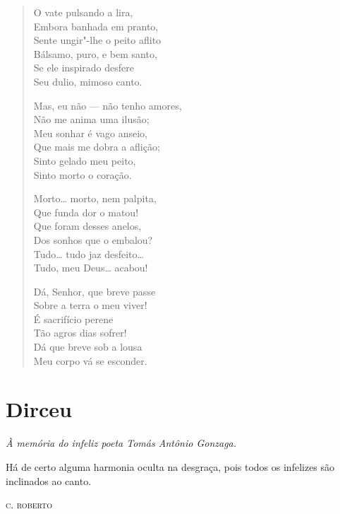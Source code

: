 \begin{verse}
O vate pulsando a lira,\\
Embora banhada em pranto,\\
Sente ungir"-lhe o peito aflito\\
Bálsamo, puro, e bem santo,\\
Se ele inspirado desfere\\
Seu dulio, mimoso canto.

Mas, eu não --- não tenho amores,\\
Não me anima uma ilusão;\\
Meu sonhar é vago anseio,\\
Que mais me dobra a aflição;\\
Sinto gelado meu peito,\\
Sinto morto o coração.

Morto\ldots{} morto, nem palpita,\\
Que funda dor o matou!\\
Que foram desses anelos,\\
Dos sonhos que o embalou?\\
Tudo\ldots{} tudo jaz desfeito\ldots{}\\
Tudo, meu Deus\ldots{} acabou!

Dá, Senhor, que breve passe\\
Sobre a terra o meu viver!\\
É sacrifício perene\\
Tão agros dias sofrer!\\
Dá que breve sob a lousa\\
Meu corpo vá se esconder.
\end{verse}

\chapter{Dirceu}

\hfill{}\emph{À memória do infeliz poeta Tomás Antônio Gonzaga.}

\epigraph{Há de certo alguma harmonia oculta na desgraça, pois todos os
infelizes são inclinados ao canto.}{\textsc{c. roberto}}

